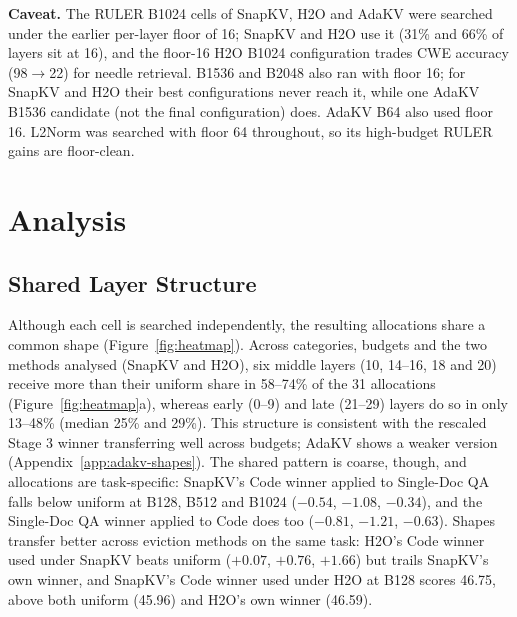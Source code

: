 \documentclass[11pt]{article}
\begin{document}
\textbf{Caveat.} The RULER B1024 cells of SnapKV, H2O and AdaKV were searched under the earlier per-layer floor of 16; SnapKV and H2O use it (31\% and 66\% of layers sit at 16), and the floor-16 H2O B1024 configuration trades CWE accuracy (98$\rightarrow$22) for needle retrieval. B1536 and B2048 also ran with floor 16; for SnapKV and H2O their best configurations never reach it, while one AdaKV B1536 candidate (not the final configuration) does. AdaKV B64 also used floor 16. L2Norm was searched with floor 64 throughout, so its high-budget RULER gains are floor-clean.




\section{Analysis}



\subsection{Shared Layer Structure}
\label{sec:shared}

Although each cell is searched independently, the resulting allocations share a common shape (Figure~\ref{fig:heatmap}). Across categories, budgets and the two methods analysed (SnapKV and H2O), six middle layers (10, 14--16, 18 and 20) receive more than their uniform share in 58--74\% of the 31 allocations (Figure~\ref{fig:heatmap}a), whereas early (0--9) and late (21--29) layers do so in only 13--48\% (median 25\% and 29\%). This structure is consistent with the rescaled Stage 3 winner transferring well across budgets; AdaKV shows a weaker version (Appendix~\ref{app:adakv-shapes}). The shared pattern is coarse, though, and allocations are task-specific: SnapKV's Code winner applied to Single-Doc QA falls below uniform at B128, B512 and B1024 ($-0.54$, $-1.08$, $-0.34$), and the Single-Doc QA winner applied to Code does too ($-0.81$, $-1.21$, $-0.63$). Shapes transfer better across eviction methods on the same task: H2O's Code winner used under SnapKV beats uniform ($+0.07$, $+0.76$, $+1.66$) but trails SnapKV's own winner, and SnapKV's Code winner used under H2O at B128 scores 46.75, above both uniform (45.96) and H2O's own winner (46.59).
\end{document}
